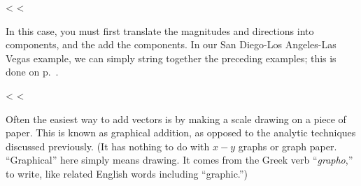 
<%
\vfill
<%

In this case, you must first translate the magnitudes and
directions into components, and the add the components.
In our San Diego-Los Angeles-Las Vegas example, we can
simply string together the preceding examples; this is done on p.~\pageref{skills-vector-addition}.

<%
\vfill
<%

Often the easiest way to add vectors is by making a scale
drawing on a piece of paper. This is known as graphical
addition, as opposed to the analytic techniques discussed previously.
(It has nothing to do with $x-y$ graphs or graph paper. ``Graphical''
here simply means drawing. It comes from the Greek verb ``\emph{grapho},'' to write,
like related English words including ``graphic.'')

\pagebreak

